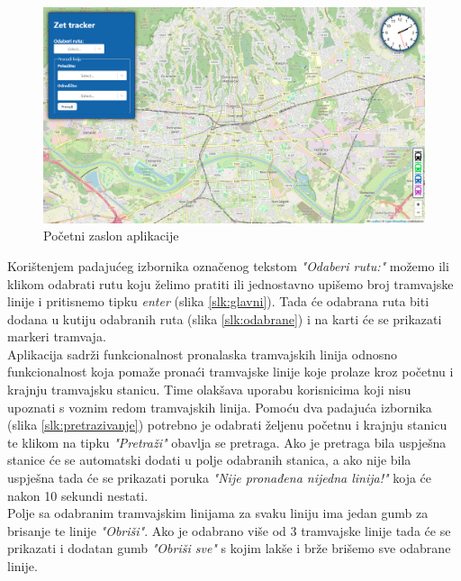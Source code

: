 \documentclass[zavrsnirad]{fer}
\begin{document}
\begin{figure}[H]
	\centering
	\includegraphics[width=\linewidth]{Figures/default.png} 
	\caption{Početni zaslon aplikacije}
	\label{slk:default}
\end{figure}
\newpage
Korištenjem padajućeg izbornika označenog tekstom \textit{"Odaberi rutu:"} možemo ili klikom odabrati rutu koju želimo pratiti ili jednostavno upišemo broj tramvajske linije i pritisnemo tipku \textit{enter} (slika \ref{slk:glavni}). Tada će odabrana ruta biti dodana u kutiju odabranih ruta (slika \ref{slk:odabrane}) i na karti će se prikazati markeri tramvaja.\\

Aplikacija sadrži funkcionalnost pronalaska tramvajskih linija odnosno funkcionalnost koja pomaže pronaći tramvajske linije koje prolaze kroz početnu i krajnju tramvajsku stanicu. Time olakšava uporabu korisnicima koji nisu upoznati s voznim redom tramvajskih linija. Pomoću dva padajuća izbornika (slika \ref{slk:pretrazivanje}) potrebno je odabrati željenu početnu i krajnju stanicu te klikom na tipku \textit{"Pretraži"} obavlja se pretraga. Ako je pretraga bila uspješna stanice će se automatski dodati u polje odabranih stanica, a ako nije bila uspješna tada će se prikazati poruka \textit{"Nije pronađena nijedna linija!"} koja će nakon 10 sekundi nestati.\\

Polje sa odabranim tramvajskim linijama za svaku liniju ima jedan gumb za brisanje te linije \textit{"Obriši"}. Ako je odabrano više od 3 tramvajske linije tada će se prikazati i dodatan gumb \textit{"Obriši sve"} s kojim lakše i brže brišemo sve odabrane linije.\\
\end{document}
